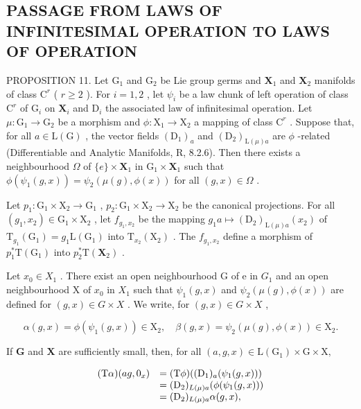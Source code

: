 \subsection{PASSAGE FROM LAWS OF INFINITESIMAL OPERATION TO LAWS OF OPERATION}

PROPOSITION 11. Let \(\mathrm{G}_1\) and \(\mathrm{G}_2\) be Lie group germs and \(\mathbf{X}_1\) and \(\mathbf{X}_2\) manifolds of class \(\mathrm{C}^r\) ( \(r \geqslant 2\) ). For \(i = 1, 2\) , let \(\psi_i\) be a law chunk of left operation of class \(\mathrm{C}^r\) of \(\mathrm{G}_i\) on \(\mathbf{X}_i\) and \(\mathrm{D}_i\) the associated law of infinitesimal operation. Let \(\mu: \mathrm{G}_1 \to \mathrm{G}_2\) be a morphism and \(\phi: \mathrm{X}_1 \to \mathrm{X}_2\) a mapping of class \(\mathrm{C}^r\) . Suppose that, for all \(a \in \mathrm{L}(\mathrm{G})\) , the vector fields \((\mathrm{D}_{1})_a\) and \((\mathrm{D}_{2})_{\mathrm{L}(\mu)a}\) are \(\phi\) -related (Differentiable and Analytic Manifolds, R, 8.2.6). Then there exists a neighbourhood \(\Omega\) of \(\{e\} \times \mathbf{X}_1\) in \(\mathrm{G}_1 \times \mathbf{X}_1\) such that \(\phi(\psi_1(g,x)) = \psi_2(\mu(g),\phi(x))\) for all \((g,x) \in \Omega\) .

Let \(p_1: \mathrm{G}_1 \times \mathrm{X}_2 \to \mathrm{G}_1\) , \(p_2: \mathrm{G}_1 \times \mathrm{X}_2 \to \mathrm{X}_2\) be the canonical projections. For all \((g_1, x_2) \in \mathrm{G}_1 \times \mathrm{X}_2\) , let \(f_{g_1, x_2}\) be the mapping \(g_1 a \mapsto (\mathrm{D}_2)_{\mathrm{L}(\mu)a}(x_2)\) of \(\mathrm{T}_{g_1}(\mathrm{G}_1) = g_1\mathrm{L}(\mathrm{G}_1)\) into \(\mathrm{T}_{x_2}(\mathrm{X}_2)\) . The \(f_{g_1, x_2}\) define a morphism of \(p_1^* \mathrm{T}(\mathrm{G}_1)\) into \(p_2^* \mathrm{T}(\mathbf{X}_2)\) .

Let \(x_0 \in X_1\) . There exist an open neighbourhood G of e in \(G_1\) and an open neighbourhood X of \(x_0\) in \(X_1\) such that \(\psi_1(g, x)\) and \(\psi_2(\mu(g), \phi(x))\) are defined for \((g, x) \in G \times X\) . We write, for \((g, x) \in G \times X\) ,

\[
\alpha (g, x) = \phi (\psi_ {1} (g, x)) \in \mathrm{X} _ {2}, \quad \beta (g, x) = \psi_ {2} (\mu (g), \phi (x)) \in \mathrm{X} _ {2}.
\]

If \(\mathbf{G}\) and \(\mathbf{X}\) are sufficiently small, then, for all \((a,g,x)\in \mathrm{L}(\mathrm{G}_1)\times \mathrm{G}\times \mathrm{X},\)

\[
\begin{array}{r l} (\mathrm{T} \alpha) (a g, 0 _ {x}) & = (\mathrm{T} \phi) ((\mathrm{D} _ {1}) _ {a} (\psi_ {1} (g, x))) \\ & = (\mathrm{D} _ {2}) _ {L (\mu) a} (\phi (\psi_ {1} (g, x))) \\ & = (\mathrm{D} _ {2}) _ {L (\mu) a} \alpha (g, x), \end{array}
\]

